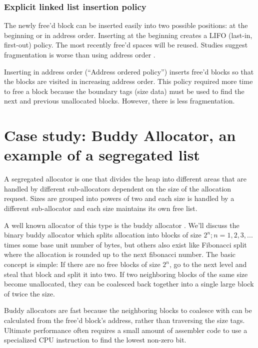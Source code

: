 \subsubsection{Explicit linked list insertion policy}

The newly free'd block can be inserted easily into two possible positions: at the beginning or in address order.
Inserting at the beginning creates a LIFO (last-in, first-out) policy.
The most recently free'd spaces will be reused. Studies suggest fragmentation is worse than using address order \cite{10.1007/3-540-60368-9_19}.

Inserting in address order (``Address ordered policy'') inserts free'd blocks so that the blocks are visited in increasing address order.
This policy required more time to free a block because the boundary tags (size data) must be used to find the next and previous unallocated blocks.
However, there is less fragmentation.

\section{Case study: Buddy Allocator, an example of a segregated list}

A segregated allocator is one that divides the heap into different areas that are handled by different sub-allocators dependent on the size of the allocation request.
Sizes are grouped into powers of two and each size is handled by a different sub-allocator and each size maintains its own free list.

A well known allocator of this type is the buddy allocator \cite[P. 85]{rangan1999foundations}.
We'll discuss the binary buddy allocator which splits allocation into blocks of size $2^n; n = 1, 2, 3, ...$ times some base unit number of bytes, but others also exist like Fibonacci split where the allocation is rounded up to the next fibonacci number.
The basic concept is simple: If there are no free blocks of size $2^n$, go to the next level and steal that block and split it into two.
If two neighboring blocks of the same size become unallocated, they can be coalesced back together into a single large block of twice the size.

Buddy allocators are fast because the neighboring blocks to coalesce with can be calculated from the free'd block's address, rather than traversing the size tags.
Ultimate performance often requires a small amount of assembler code to use a specialized CPU instruction to find the lowest non-zero bit.

